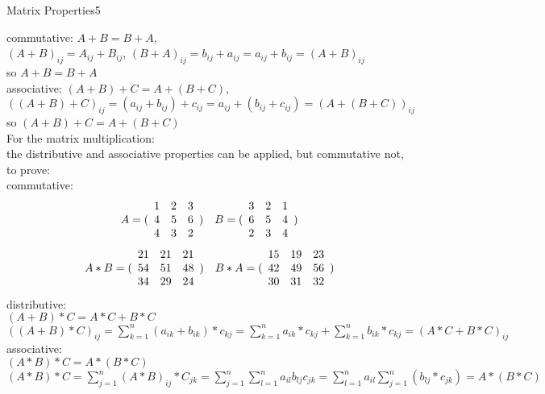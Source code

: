 \begin{questions}
\begin{question}{Matrix Properties}{5}
\begin{answer}
    
    commutative:  $ A + B  =  B + A$, \\ \quad $ (A+B)_{ij}  =  A_{ij} + B_{ij} $, 
    \quad $(B + A)_{ij}  =  b_{ij} + a_{ij} = a_{ij} + b_{ij} = (A+B)_{ij} $ \\
    so $ A + B  =  B + A$   \\ 
    associative:  $(A+B)+C = A +(B+C)$, \\ 
    $((A+B)+C)_{ij} = ( a_{ij} + b_{ij} ) + c_{ij} =  a_{ij} + ( b_{ij}  + c_{ij} ) = (A+(B+C))_{ij} $ \\
    so $ (A+B)+C = A+(B+C) $ \\
    For the matrix multiplication:\\
    the distributive and associative properties can be applied, but commutative not, to prove:\\
    commutative:
    \begin{align*}
        A = ( \begin{array}{c c c} 
            1 & 2 & 3 \\
            4 & 5 & 6 \\ 
            4 & 3 & 2 \end{array} )  \quad
        B = ( \begin{array}{c c c} 
            3 & 2 & 1 \\
            6 & 5 & 4 \\ 
            2 & 3 & 4 \end{array} )  
    \end{align*}
    \begin{align*}
        A * B = ( \begin{array}{c c c} 
            21 & 21 & 21 \\
            54 & 51 & 48 \\ 
            34 & 29 & 24 \end{array} )  \quad
        B * A = ( \begin{array}{c c c} 
            15 & 19 & 23 \\
            42 & 49 & 56 \\ 
            30 & 31 & 32 \end{array} )  
    \end{align*}
    distributive:\\
    $(A+B)*C=A*C+B*C$\\
    $((A+B)*C)_{ij} = \sum_{k=1}^n { (a_{ik}+b_{ik} )*c_{kj} } = \sum_{k=1}^n { a_{ik}*c_{kj} } + \sum_{k=1}^n{b_{ik}*c_{kj} }
    = (A*C + B*C  )_{ij} $\\
    associative:\\
    $(A*B)*C = A*(B*C)$\\
    $(A*B)*C = \sum_{j=1}^n (A*B)_{ij}*C_{jk} = \sum_{j=1}^n \sum_{l=1}^n a_{il}b_{lj}c_{jk} 
    = \sum_{l=1}^n {a_{il}} \sum_{j=1}^n(b_{lj}*c_{jk}) = A*(B*C) $


\end{answer}
\end{question}
\end{questions}
